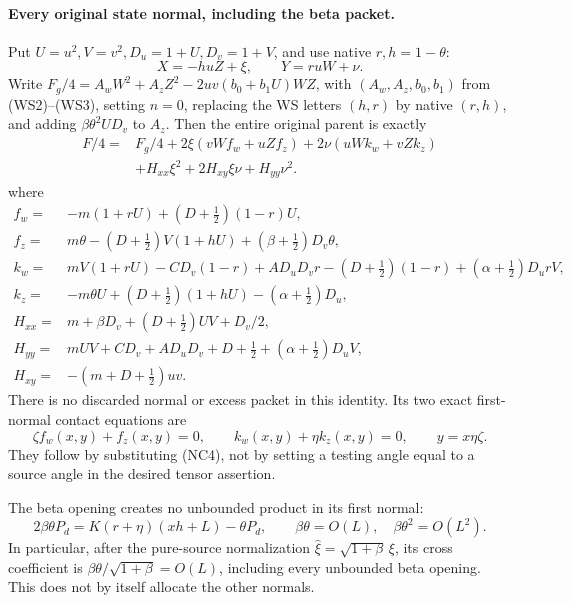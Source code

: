 \paragraph{Every original state normal, including the beta packet.}
Put $U=u^2,V=v^2,D_u=1+U,D_v=1+V$, and use native $r,h=1-\theta$:
\[
 X=-huZ+\xi,\qquad Y=ruW+\nu.
\]
Write $F_g/4=A_wW^2+A_zZ^2-2uv(b_0+b_1U)WZ$, with
$(A_w,A_z,b_0,b_1)$ from (WS2)--(WS3), setting $n=0$, replacing
the WS letters $(h,r)$ by native $(r,h)$, and adding
$\beta\theta^2UD_v$ to $A_z$. Then the entire original parent is
exactly
\[
\begin{split}
 F/4={}&F_g/4+2\xi(vWf_w+uZf_z)+2\nu(uWk_w+vZk_z)\\
 &+H_{xx}\xi^2+2H_{xy}\xi\nu+H_{yy}\nu^2.
\end{split}                                               \tag{SN1}
\]
where
\[
\begin{aligned}
 f_w={}&-m(1+rU)+(D+\tfrac12)(1-r)U,\\
 f_z={}&m\theta-(D+\tfrac12)V(1+hU)
                    +(\beta+\tfrac12)D_v\theta,\\
 k_w={}&mV(1+rU)-CD_v(1-r)+AD_uD_vr
             -(D+\tfrac12)(1-r)+(\alpha+\tfrac12)D_urV,\\
 k_z={}&-m\theta U+(D+\tfrac12)(1+hU)
                              -(\alpha+\tfrac12)D_u,\\
 H_{xx}={}&m+\beta D_v+(D+\tfrac12)UV+D_v/2,\\
 H_{yy}={}&mUV+CD_v+AD_uD_v+D+\tfrac12
                              +(\alpha+\tfrac12)D_uV,\\
 H_{xy}={}&-(m+D+\tfrac12)uv.
\end{aligned}                                                   \tag{SN2}
\]
There is no discarded normal or excess packet in this identity.
Its two exact first-normal contact equations are
\[
 \zeta f_w(x,y)+f_z(x,y)=0,\qquad
 k_w(x,y)+\eta k_z(x,y)=0,\qquad y=x\eta\zeta.             \tag{SN3}
\]
They follow by substituting (NC4), not by setting a testing angle
equal to a source angle in the desired tensor assertion.

The beta opening creates no unbounded product in its first normal:
\[
 2\beta\theta P_d=K(r+\eta)(xh+L)-\theta P_d,
 \qquad \beta\theta=O(L),\quad \beta\theta^2=O(L^2).       \tag{SN4}
\]
In particular, after the pure-source normalization
$\widehat\xi=\sqrt{1+\beta}\,\xi$, its cross coefficient is
$\beta\theta/\sqrt{1+\beta}=O(L)$, including every unbounded
beta opening. This does not by itself allocate the other normals.

